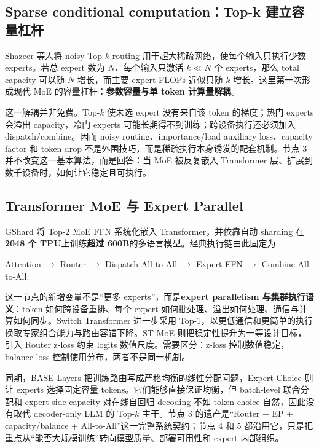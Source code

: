 \documentclass[10pt,a4paper,fontset=none]{ctexart}
\newcommand{\term}[1]{\textbf{#1}}
\begin{document}
\subsection{Sparse conditional computation：Top-k 建立容量杠杆}

Shazeer 等人将 noisy Top-$k$ routing 用于超大稀疏网络\cite{shazeer2017outrageously}，使每个输入只执行少数 experts。若总 expert 数为 $N$、每个输入只激活 $k\ll N$ 个 experts，那么 total capacity 可以随 $N$ 增长，而主要 expert FLOPs 近似只随 $k$ 增长。这里第一次形成现代 MoE 的容量杠杆：\term{参数容量与单 token 计算量解耦}。

这一解耦并非免费。Top-$k$ 使未选 expert 没有来自该 token 的梯度；热门 experts 会溢出 capacity，冷门 experts 可能长期得不到训练；跨设备执行还必须加入 dispatch/combine。因而 noisy routing、importance/load auxiliary loss、capacity factor 和 token drop 不是外围技巧，而是稀疏执行本身诱发的配套机制。节点 3 并不改变这一基本算法，而是回答：当 MoE 被反复嵌入 Transformer 层、扩展到数千设备时，如何让它稳定且可执行。

\subsection{Transformer MoE 与 Expert Parallel}

GShard 将 Top-2 MoE FFN 系统化嵌入 Transformer，并依靠自动 sharding 在\textbf{2048 个 TPU}上训练\textbf{超过 600B}的多语言模型\cite{lepikhin2020gshard}。经典执行链由此固定为
\begin{center}
\textsf{Attention $\rightarrow$ Router $\rightarrow$ Dispatch All-to-All $\rightarrow$ Expert FFN $\rightarrow$ Combine All-to-All}.
\end{center}
这一节点的新增变量不是“更多 experts”，而是\term{expert parallelism 与集群执行语义}：token 如何跨设备重排、每个 expert 如何批处理、溢出如何处理、通信与计算如何同步。Switch Transformer 进一步采用 Top-1，以更低通信和更简单的执行换取专家组合能力与路由容错下降\cite{fedus2021switch}。ST-MoE 则把稳定性提升为一等设计目标，引入 Router z-loss 约束 logits 数值尺度\cite{zoph2022stmoe}。需要区分：z-loss 控制数值稳定，balance loss 控制使用分布，两者不是同一机制。

同期，BASE Layers 把训练路由写成严格均衡的线性分配问题\cite{lewis2021base}，Expert Choice 则让 experts 选择固定容量 tokens\cite{zhou2022expertchoice}。它们能够直接保证均衡，但 batch-level 联合分配和 expert-side capacity 对在线自回归 decoding 不如 token-choice 自然，因此没有取代 decoder-only LLM 的 Top-$k$ 主干。节点 3 的遗产是“Router + EP + capacity/balance + All-to-All”这一完整系统契约；节点 4 和 5 都沿用它，只是把重点从“能否大规模训练”转向模型质量、部署可用性和 expert 内部组织。
\end{document}

